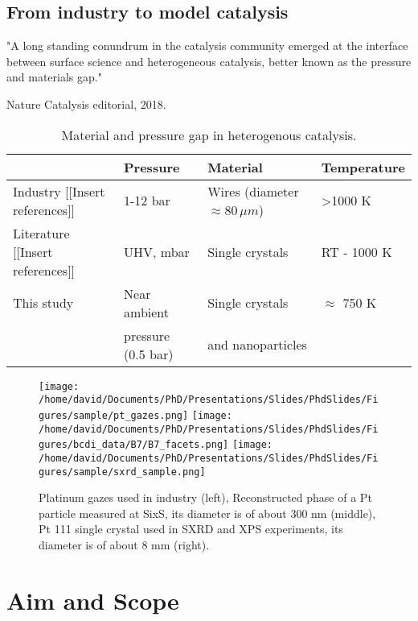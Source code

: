 \subsection{From industry to model catalysis}

"A long standing conundrum in the catalysis community emerged at the interface between surface science and heterogeneous catalysis, better known as the pressure and materials gap."

Nature Catalysis editorial, 2018.

\begin{table}[!htb]
    \centering
    \begin{tabular}{l|l|l|l}
    \toprule
                & Pressure    & Material       &     Temperature \\
    \midrule
    Industry {\color{DarkOrange}[[Insert references]]}  & 1-12 bar & Wires (diameter $\approx 80 \, \mu m$) & \textgreater 1000 K \\
    \midrule
    Literature {\color{DarkOrange}[[Insert references]]} & UHV, mbar & Single crystals & RT - 1000 K \\ \midrule
    This study & Near ambient    & Single crystals  & $\approx$ 750 K \\
               & pressure (0.5 bar)  & and nanoparticles & \\
    \bottomrule
    \end{tabular}
    \caption{Material and pressure gap in heterogenous catalysis.}
    \label{tab:gap}
\end{table}

\begin{figure}[!htb]
    \centering
    \texttt{[image: /home/david/Documents/PhD/Presentations/Slides/PhdSlides/Figures/sample/pt\_gazes.png]}
    \texttt{[image: /home/david/Documents/PhD/Presentations/Slides/PhdSlides/Figures/bcdi\_data/B7/B7\_facets.png]}
    \texttt{[image: /home/david/Documents/PhD/Presentations/Slides/PhdSlides/Figures/sample/sxrd\_sample.png]}
    \caption{Platinum gazes used in industry (left), Reconstructed phase of a Pt particle measured at SixS, its diameter is of about 300 nm (middle), Pt 111 single crystal used in SXRD and XPS experiments, its diameter is of about 8 mm (right).}
\end{figure}

\section{Aim and Scope}

